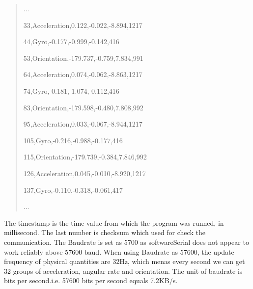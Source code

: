 \begin{quote}
\centering
...

33,Acceleration,0.122,-0.022,-8.894,1217

44,Gyro,-0.177,-0.999,-0.142,416

53,Orientation,-179.737,-0.759,7.834,991

64,Acceleration,0.074,-0.062,-8.863,1217

74,Gyro,-0.181,-1.074,-0.112,416

83,Orientation,-179.598,-0.480,7.808,992

95,Acceleration,0.033,-0.067,-8.944,1217

105,Gyro,-0.216,-0.988,-0.177,416

115,Orientation,-179.739,-0.384,7.846,992

126,Acceleration,0.045,-0.010,-8.920,1217

137,Gyro,-0.110,-0.318,-0.061,417

...
\end{quote}

The timestamp is the time value from which the program was runned, in millisecond. The last number is checksum which used for check the communication.
The Baudrate is set as 5700 as softwareSerial does not appear to work reliably above 57600 baud.\cite{https://github.com/ArduSat/ArdusatSDK}
When using Baudrate as 57600, the update frequency of physical quantities are 32Hz, which menas every second we can get 32 groups of acceleration, angular rate and orientation. The unit of baudrate is bits per second.i.e. 57600 bits per second equals 7.2KB/s.

